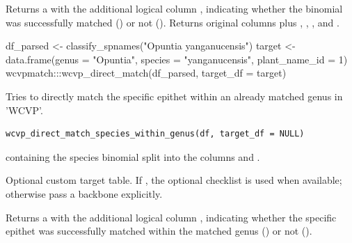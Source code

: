 \documentclass[a4paper]{book}
\begin{document}
%
\begin{Value}
Returns a  with the additional logical column , indicating whether the binomial was successfully matched () or not ().
Returns original columns plus , , , and .
\end{Value}
%
\begin{Examples}
\begin{ExampleCode}

df_parsed <- classify_spnames("Opuntia yanganucensis")
target <- data.frame(genus = "Opuntia", species = "yanganucensis", plant_name_id = 1)
wcvpmatch:::wcvp_direct_match(df_parsed, target_df = target)

\end{ExampleCode}
\end{Examples}
%
\begin{Description}
\strong{[Stable]}

Tries to directly match the specific epithet within an already matched genus in 'WCVP'.
\end{Description}
%
\begin{Usage}
\begin{verbatim}
wcvp_direct_match_species_within_genus(df, target_df = NULL)
\end{verbatim}
\end{Usage}
%
\begin{Arguments}
\begin{ldescription}
\item[\code{df}]  containing the species binomial split into the columns  and .

\item[\code{target\_df}] Optional custom target table. If , the optional  checklist is used when available; otherwise pass a backbone explicitly.
\end{ldescription}
\end{Arguments}
%
\begin{Value}
Returns a  with the additional logical column , indicating whether the specific epithet was successfully matched within the matched genus () or not ().
\end{Value}
\end{document}
